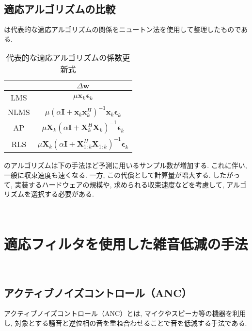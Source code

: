 \subsection{適応アルゴリズムの比較}\label{algo-compare}

は代表的な適応アルゴリズムの関係をニュートン法を使用して整理したものである. 

\begin{table}[H]
  \centering
  \caption{代表的な適応アルゴリズムの係数更新式}
  \label{tab:formula}
  \begin{tabular}{|c|c|}
  \hline
       & \(\Delta \bm{w}\)                                                                                             \\ \hline
  LMS  & \( \mu \bm{x}_k \bm{\epsilon}_k \)                                                                         \\ \hline
  NLMS & \( \mu \left( \alpha \bm{I} + \bm{x}_k \bm{x}_k^H \right)^{-1} \bm{x}_k \bm{\epsilon}_k \)        \\ \hline
  AP   & \(\mu \bm{X}_k \left( \alpha \bm{I} + \bm{X}_k^H \bm{X}_k \right)^{-1} \bm{\epsilon}_k\)          \\ \hline
  RLS  & \( \mu \bm{X}_k \left( \alpha \bm{I} + \bm{X}_{1:k}^H \bm{X}_{1:k} \right)^{-1} \bm{\epsilon}_k\) \\ \hline
  \end{tabular}
\end{table}

のアルゴリズムは下の手法ほど予測に用いるサンプル数が増加する. これに伴い, 一般に収束速度も速くなる. 一方, この代償として計算量が増大する. したがって, 実装するハードウェアの規模や, 求められる収束速度などを考慮して, アルゴリズムを選択する必要がある\cite{adaptive_filters}. 

\newpage

\
\section{適応フィルタを使用した雑音低減の手法}\label{adf-noise-reduction}

\
\subsection{アクティブノイズコントロール（ANC）}\label{anc}

アクティブノイズコントロール（ANC）とは, マイクやスピーカ等の機器を利用し, 対象とする騒音と逆位相の音を重ね合わせることで音を低減する手法である. 

